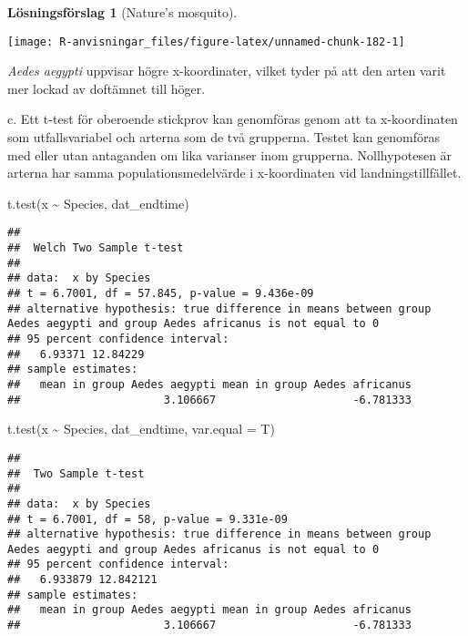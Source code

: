 \documentclass[
]{book}
\newenvironment{Shaded}{\begin{snugshade}}{\end{snugshade}}
\newcommand{\AttributeTok}[1]{\textcolor[rgb]{0.77,0.63,0.00}{#1}}
\newcommand{\FunctionTok}[1]{\textcolor[rgb]{0.00,0.00,0.00}{#1}}
\newcommand{\NormalTok}[1]{#1}
\newcommand{\SpecialCharTok}[1]{\textcolor[rgb]{0.00,0.00,0.00}{#1}}
\theoremstyle{definition}
\theoremstyle{definition}
\theoremstyle{definition}
\theoremstyle{definition}
\newtheorem{hypothesis}{Lösningsförslag}[chapter]
\theoremstyle{remark}
\begin{document}
\begin{hypothesis}[Nature's mosquito]
\begin{center}\texttt{[image: R-anvisningar\_files/figure-latex/unnamed-chunk-182-1]} \end{center}

\emph{Aedes aegypti} uppvisar högre x-koordinater, vilket tyder på att den arten varit mer lockad av doftämnet till höger.

c. Ett t-test för oberoende stickprov kan genomföras genom att ta x-koordinaten som utfallsvariabel och arterna som de två grupperna. Testet kan genomföras med eller utan antaganden om lika varianser inom grupperna. Nollhypotesen är arterna har samma populationsmedelvärde i x-koordinaten vid landningstillfället.

\begin{Shaded}
\begin{Highlighting}[]
\FunctionTok{t.test}\NormalTok{(x }\SpecialCharTok{\textasciitilde{}}\NormalTok{ Species, dat\_endtime)}
\end{Highlighting}
\end{Shaded}

\begin{verbatim}
## 
##  Welch Two Sample t-test
## 
## data:  x by Species
## t = 6.7001, df = 57.845, p-value = 9.436e-09
## alternative hypothesis: true difference in means between group Aedes aegypti and group Aedes africanus is not equal to 0
## 95 percent confidence interval:
##   6.93371 12.84229
## sample estimates:
##   mean in group Aedes aegypti mean in group Aedes africanus 
##                      3.106667                     -6.781333
\end{verbatim}

\begin{Shaded}
\begin{Highlighting}[]
\FunctionTok{t.test}\NormalTok{(x }\SpecialCharTok{\textasciitilde{}}\NormalTok{ Species, dat\_endtime, }\AttributeTok{var.equal =}\NormalTok{ T)}
\end{Highlighting}
\end{Shaded}

\begin{verbatim}
## 
##  Two Sample t-test
## 
## data:  x by Species
## t = 6.7001, df = 58, p-value = 9.331e-09
## alternative hypothesis: true difference in means between group Aedes aegypti and group Aedes africanus is not equal to 0
## 95 percent confidence interval:
##   6.933879 12.842121
## sample estimates:
##   mean in group Aedes aegypti mean in group Aedes africanus 
##                      3.106667                     -6.781333
\end{verbatim}


\end{hypothesis}
\end{document}
